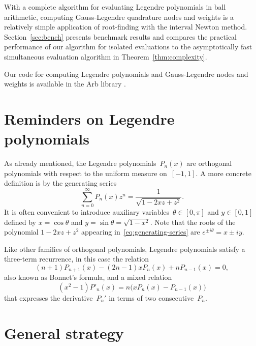 \documentclass[11pt,a4paper]{article}
\begin{document}
With a complete algorithm for evaluating Legendre polynomials
in ball arithmetic,
computing Gauss-Legendre quadrature nodes and weights
is a relatively simple application of root-finding with the
interval Newton method.
Section~\ref{sec:bench} presents benchmark results
and compares the practical performance
of our algorithm for isolated evaluations
to the asymptotically fast simultaneous evaluation
algorithm in Theorem~\ref{thm:complexity}.

Our code for computing Legendre polynomials and
Gauss-Legendre nodes and weights is available
in the Arb library \cite{Johansson2017arb}.

\section{Reminders on Legendre polynomials}

As already mentioned, the Legendre polynomials~$P_n(x)$ are orthogonal
polynomials with respect to the uniform measure on~$[-1,1]$.
A more concrete definition is by the generating series
\begin{equation} \label{eq:generating-series}
  \sum_{n=0}^{\infty} P_n(x) z^n
  = \frac{1}{\sqrt{1 - 2 x z + z^2}}.
\end{equation}
It is often convenient to introduce auxiliary
variables~$\theta \in [0, \pi]$ and $y \in [0, 1]$ defined by
$x = \cos \theta$ and $y = \sin \theta = \sqrt{1 - x^2}$.
Note that the roots of the polynomial $1 - 2 x z + z^2$ appearing
in \eqref{eq:generating-series} are $e^{\pm i \theta} = x \pm i y$.

Like other families of orthogonal polynomials, Legendre polynomials
satisfy a three-term recurrence, in this case the relation
\begin{equation} \label{eq:recurrence}
  (n + 1) P_{n+1}(x) - (2n - 1) x P_n(x) + n P_{n-1}(x) = 0,
\end{equation}
also known as Bonnet's formula, and a mixed relation
\begin{equation} \label{eq:mixed}
  (x^2 - 1) P'_n(x) = n \bigl( x P_n(x) - P_{n-1}(x) \bigl)
\end{equation}
that expresses the derivative $P_n'$ in terms of two
consecutive $P_n$.

\section{General strategy}

\label{sec:general}
\end{document}
